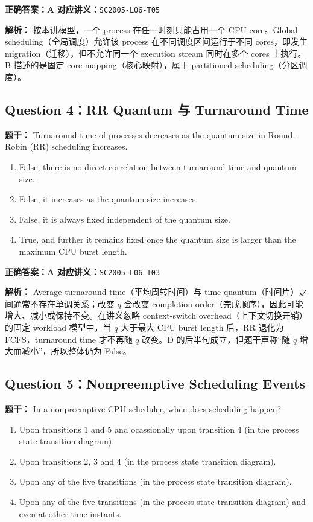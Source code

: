 \documentclass[11pt,a4paper,fontset=fandol]{ctexart}
\renewcommand{\exercisequestion}[2]{%
  \Needspace{5\baselineskip}%
  \subsection{#2}\label{exercise:#1}%
}
\renewenvironment{checkedsolution}
  {\par\nopagebreak[4]\textbf{解析：}\ignorespaces}
  {\par}
\begin{document}
\textbf{正确答案：A}\qquad
\textbf{对应讲义：}\texttt{SC2005-L06-T05}

\begin{checkedsolution}
按本讲模型，一个 process 在任一时刻只能占用一个 CPU core。Global scheduling（全局调度）允许该 process 在不同调度区间运行于不同 cores，即发生 migration（迁移），但不允许同一个 execution stream 同时在多个 cores 上执行。B 描述的是固定 core mapping（核心映射），属于 partitioned scheduling（分区调度）。
\end{checkedsolution}

\exercisequestion{SC2005-HW02-Q04}{Question 4：RR Quantum 与 Turnaround Time}

\textbf{题干：} Turnaround time of processes decreases as the quantum size in Round-Robin (RR) scheduling increases.

\begin{enumerate}[label=\Alph*.,leftmargin=2.4em]
  \item False, there is no direct correlation between turnaround time and quantum size.
  \item False, it increases as the quantum size increases.
  \item False, it is always fixed independent of the quantum size.
  \item True, and further it remains fixed once the quantum size is larger than the maximum CPU burst length.
\end{enumerate}

\textbf{正确答案：A}\qquad
\textbf{对应讲义：}\texttt{SC2005-L06-T03}

\begin{checkedsolution}
Average turnaround time（平均周转时间）与 time quantum（时间片）之间通常不存在单调关系；改变 $q$ 会改变 completion order（完成顺序），因此可能增大、减小或保持不变。在讲义忽略 context-switch overhead（上下文切换开销）的固定 workload 模型中，当 $q$ 大于最大 CPU burst length 后，RR 退化为 FCFS，turnaround time 才不再随 $q$ 改变。D 的后半句成立，但题干声称“随 $q$ 增大而减小”，所以整体仍为 False。
\end{checkedsolution}

\exercisequestion{SC2005-HW02-Q05}{Question 5：Nonpreemptive Scheduling Events}

\textbf{题干：} In a nonpreemptive CPU scheduler, when does scheduling happen?

\begin{enumerate}[label=\Alph*.,leftmargin=2.4em]
  \item Upon transitions 1 and 5 and ocassionally upon transition 4 (in the process state transition diagram).
  \item Upon transitions 2, 3 and 4 (in the process state transition diagram).
  \item Upon any of the five transitions (in the process state transition diagram).
  \item Upon any of the five transitions (in the process state transition diagram) and even at other time instants.
\end{enumerate}
\end{document}
